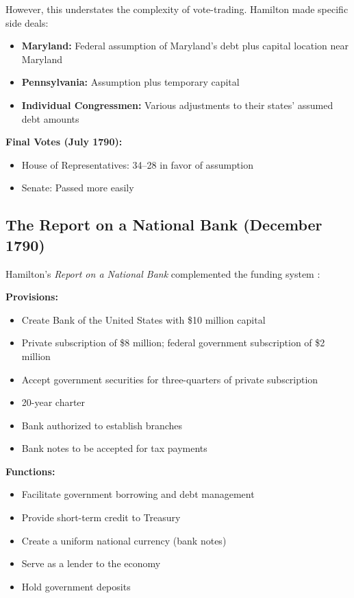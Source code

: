 \documentclass[12pt]{article}
\begin{document}
However, this understates the complexity of vote-trading. Hamilton made specific side deals:
\begin{itemize}
\item \textbf{Maryland:} Federal assumption of Maryland's debt plus capital location near Maryland
\item \textbf{Pennsylvania:} Assumption plus temporary capital
\item \textbf{Individual Congressmen:} Various adjustments to their states' assumed debt amounts
\end{itemize}

\textbf{Final Votes (July 1790):}
\begin{itemize}
\item House of Representatives: 34--28 in favor of assumption
\item Senate: Passed more easily
\end{itemize}

\subsection{The Report on a National Bank (December 1790)}

Hamilton's \textit{Report on a National Bank} complemented the funding system \citep{Hamilton1790bank}:

\textbf{Provisions:}
\begin{itemize}
\item Create Bank of the United States with \$10 million capital
\item Private subscription of \$8 million; federal government subscription of \$2 million
\item Accept government securities for three-quarters of private subscription
\item 20-year charter
\item Bank authorized to establish branches
\item Bank notes to be accepted for tax payments
\end{itemize}

\textbf{Functions:}
\begin{itemize}
\item Facilitate government borrowing and debt management
\item Provide short-term credit to Treasury
\item Create a uniform national currency (bank notes)
\item Serve as a lender to the economy
\item Hold government deposits
\end{itemize}
\end{document}
